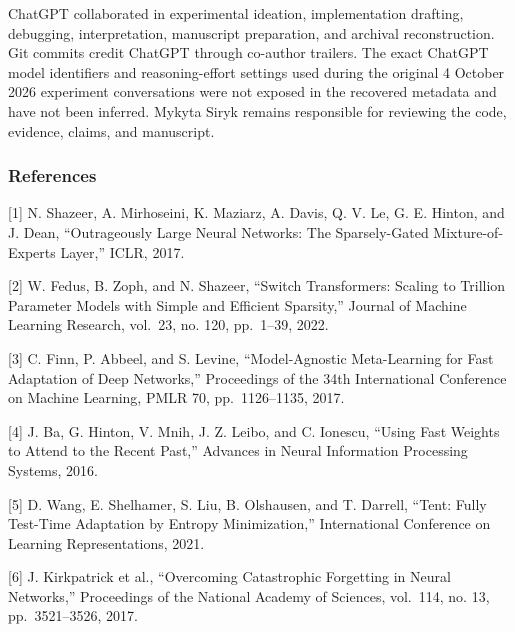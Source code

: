 \documentclass[
  10pt,
]{article}
\begin{document}
ChatGPT collaborated in experimental ideation, implementation drafting,
debugging, interpretation, manuscript preparation, and archival
reconstruction. Git commits credit ChatGPT through co-author trailers.
The exact ChatGPT model identifiers and reasoning-effort settings used
during the original 4 October 2026 experiment conversations were not
exposed in the recovered metadata and have not been inferred. Mykyta
Siryk remains responsible for reviewing the code, evidence, claims, and
manuscript.

\hypertarget{references}{%
\subsubsection{References}\label{references}}

{[}1{]} N. Shazeer, A. Mirhoseini, K. Maziarz, A. Davis, Q. V. Le, G. E.
Hinton, and J. Dean, ``Outrageously Large Neural Networks: The
Sparsely-Gated Mixture-of-Experts Layer,'' ICLR, 2017.

{[}2{]} W. Fedus, B. Zoph, and N. Shazeer, ``Switch Transformers:
Scaling to Trillion Parameter Models with Simple and Efficient
Sparsity,'' Journal of Machine Learning Research, vol.~23, no. 120,
pp.~1--39, 2022.

{[}3{]} C. Finn, P. Abbeel, and S. Levine, ``Model-Agnostic
Meta-Learning for Fast Adaptation of Deep Networks,'' Proceedings of the
34th International Conference on Machine Learning, PMLR 70,
pp.~1126--1135, 2017.

{[}4{]} J. Ba, G. Hinton, V. Mnih, J. Z. Leibo, and C. Ionescu, ``Using
Fast Weights to Attend to the Recent Past,'' Advances in Neural
Information Processing Systems, 2016.

{[}5{]} D. Wang, E. Shelhamer, S. Liu, B. Olshausen, and T. Darrell,
``Tent: Fully Test-Time Adaptation by Entropy Minimization,''
International Conference on Learning Representations, 2021.

{[}6{]} J. Kirkpatrick et al., ``Overcoming Catastrophic Forgetting in
Neural Networks,'' Proceedings of the National Academy of Sciences,
vol.~114, no. 13, pp.~3521--3526, 2017.
\end{document}
